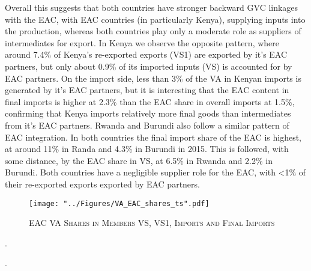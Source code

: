 \documentclass[a4paper]{article}
\begin{document}
Overall this suggests that both countries have stronger backward GVC linkages with the EAC, with EAC countries (in particularly Kenya), supplying inputs into the production, whereas both countries play only a moderate role as suppliers of intermediates for export. In Kenya we observe the opposite pattern, where around 7.4\% of Kenya's re-exported exports (VS1) are exported by it's EAC partners, but only about 0.9\% of its imported inputs (VS) is accounted for by EAC partners. On the import side, less than 3\% of the VA in Kenyan imports is generated by it's EAC partners, but it is interesting that the EAC content in final imports is higher at 2.3\% than the EAC share in overall imports at 1.5\%, confirming that Kenya imports relatively more final goods than intermediates from it's EAC partners. Rwanda and Burundi also follow a similar pattern of EAC integration. In both countries the final import share of the EAC is highest, at around 11\% in Randa and 4.3\% in Burundi in 2015. This is followed, with some distance, by the EAC share in VS, at 6.5\% in Rwanda and 2.2\% in Burundi. Both countries have a negligible supplier role for the EAC, with <1\% of their re-exported exports exported by EAC partners. 



\begin{figure}[h!]
\centering
\caption{\label{fig:VAEACshares}\textsc{EAC VA Shares in Members VS, VS1, Imports and Final Imports}}
\texttt{[image: "../Figures/VA\_EAC\_shares\_ts".pdf]} %
\end{figure}
\FloatBarrier



.


.
\end{document}
